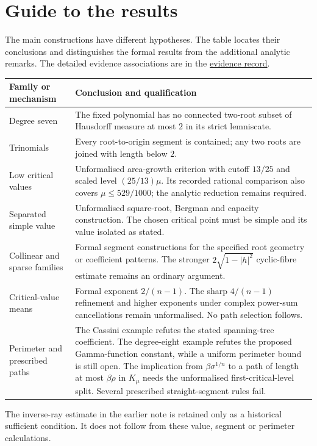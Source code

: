 \documentclass[11pt]{article}
\begin{document}
\section{Guide to the results}\label{sec:erdos-1041-complete-family-map}

The main constructions have different hypotheses. The table locates
their conclusions and distinguishes the formal results from the
additional analytic remarks. The detailed evidence associations are
in the \href{\evidencerecordurl}{evidence record}.
\begin{center}\small
\begin{tabular}{p{.24\linewidth}p{.65\linewidth}}
\toprule
Family or mechanism & Conclusion and qualification \\
\midrule
Degree seven & The fixed polynomial has no connected two-root subset
of Hausdorff measure at most $2$ in its strict lemniscate. \\
Trinomials & Every root-to-origin segment is contained; any two roots
are joined with length below $2$. \\
Low critical values & Unformalised area-growth criterion with cutoff
$13/25$ and scaled level $(25/13)\mu$. Its recorded rational comparison
also covers $\mu\le529/1000$; the analytic reduction remains required. \\
Separated simple value & Unformalised square-root, Bergman and capacity
construction. The chosen critical point must be simple and its value
isolated as stated. \\
Collinear and sparse families & Formal segment constructions for the
specified root geometry or coefficient patterns. The stronger
$2\sqrt{1-|h|^2}$ cyclic-fibre estimate remains an ordinary argument. \\
Critical-value means & Formal exponent $2/(n-1)$. The sharp
$4/(n-1)$ refinement and higher exponents under complex power-sum
cancellations remain unformalised. No path selection follows. \\
Perimeter and prescribed paths & The Cassini example refutes the stated
spanning-tree coefficient. The degree-eight example refutes the proposed
Gamma-function constant, while a uniform perimeter bound is still open.
The implication from $\beta\sigma^{1/n}$ to a path of length at most
$\beta\rho$ in $K_\mu$ needs the unformalised first-critical-level split.
Several prescribed straight-segment rules fail. \\
\bottomrule
\end{tabular}\end{center}
The inverse-ray estimate in the earlier note is retained only as a
historical sufficient condition. It does not follow from these value,
segment or perimeter calculations.
\end{document}
